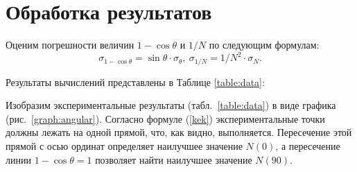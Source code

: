 \documentclass[a4paper, 12pt]{article}
\begin{document}
	
	

		
	\section*{Обработка результатов}
		Оценим погрешности величин $1 - \cos \theta$ и $1/N$ по следующим формулам:
		\begin{equation*}
			\sigma_{1-\cos \theta} = \sin \theta \cdot \sigma_\theta, \ \sigma_{1/N} = 1/N^2 \cdot \sigma_N.
		\end{equation*}
			
		Результаты вычислений представлены в Таблице \ref{table:data}:
		
		Изобразим экспериментальные результаты (табл.~\ref{table:data}) в виде графика (рис.~\ref{graph:angular}). Согласно формуле (\ref{kek}) экспериментальные точки должны лежать на одной прямой, что, как видно, выполняется. Пересечение этой прямой с осью ординат определяет наилучшее значение $N(0)$, а пересечение линии $1 - \cos \theta = 1$ позволяет найти наилучшее значение $N(90)$. 
		
\end{document}
